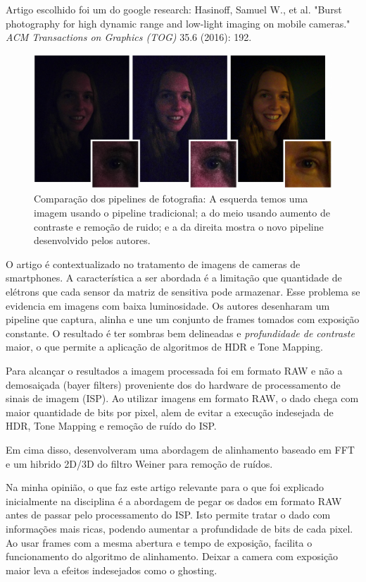 \documentclass[a4paper]{sbgames}               %
\begin{document}
\pagebreak

Artigo escolhido foi um do google research: Hasinoff, Samuel W., et al. "Burst photography for high dynamic range and low-light imaging on mobile cameras." \textit{ACM Transactions on Graphics (TOG)} 35.6 (2016): 192. \cite{hasinoff2016burst}

\begin{figure} [h!]
  \centering 
  \includegraphics[width=0.95\linewidth]{imgs/burstgoogle}
 \caption{Comparação dos pipelines de fotografia: A esquerda temos uma imagem usando o pipeline tradicional; a do meio usando aumento de contraste e remoção de ruido; e a da direita mostra o novo pipeline desenvolvido pelos autores.} 
 \label{fig:burstgoogle} 
\end{figure}

O artigo é contextualizado no tratamento de imagens de cameras de smartphones. A característica a ser abordada é  a limitação que quantidade de elétrons que cada sensor da matriz de sensitiva pode armazenar. Esse problema se evidencia em imagens com baixa luminosidade. Os autores desenharam um pipeline que captura, alinha e une um conjunto de frames tomados com exposição constante. O resultado é ter sombras bem delineadas e \textit{profundidade de contraste} maior, o que permite a aplicação de algoritmos de HDR e Tone Mapping. 

Para alcançar o resultados a imagem processada foi em formato RAW e não a demosaiçada (bayer filters) proveniente dos do hardware de processamento de sinais de imagem (ISP). Ao utilizar imagens em formato RAW, o dado chega com maior quantidade de bits por pixel, alem de evitar a execução indesejada de HDR, Tone Mapping e remoção de ruído do ISP.

Em cima disso, desenvolveram uma abordagem de alinhamento baseado em FFT e um hibrido 2D/3D do filtro Weiner para remoção de ruídos.

Na minha opinião, o que faz este artigo relevante para o que foi explicado inicialmente na disciplina é a abordagem de pegar os dados em formato RAW antes de passar pelo processamento do ISP. Isto permite tratar o dado com informações mais ricas, podendo aumentar a profundidade de bits de cada pixel. Ao usar frames com a mesma abertura e tempo de exposição, facilita o funcionamento do algoritmo de alinhamento. Deixar a camera com exposição maior leva a efeitos indesejados como o ghosting.
\end{document}
